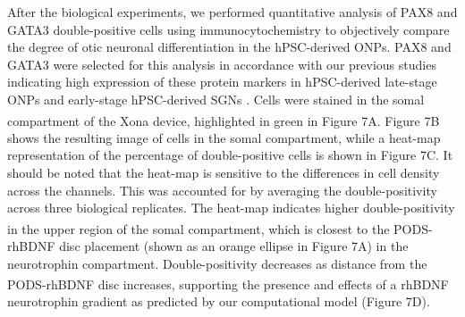 \documentclass[review]{elsarticle}
\begin{document}
 After the biological experiments, we performed quantitative analysis of PAX8 and GATA3 double-positive cells using immunocytochemistry to objectively compare the degree of otic neuronal differentiation in the hPSC-derived ONPs. PAX8 and GATA3 were selected for this analysis in accordance with our previous studies indicating high expression of these protein markers in hPSC-derived late-stage ONPs and early-stage hPSC-derived SGNs \cite{Heuer2021,Chang2020, Matsuoka2017}. Cells were stained in the somal compartment of the Xona\textsuperscript{\texttrademark} device, highlighted in green in Figure 7A. Figure 7B shows the resulting image of cells in the somal compartment, while a heat-map representation of the percentage of double-positive cells is shown in Figure 7C. It should be noted that the heat-map is sensitive to the differences in cell density across the channels. This was accounted for by averaging the double-positivity across three biological replicates. The heat-map indicates higher double-positivity in the upper region of the somal compartment, which is closest to the PODS\textsuperscript{\textregistered}-rhBDNF disc placement (shown as an orange ellipse in Figure 7A) in the neurotrophin compartment. Double-positivity decreases as distance from the PODS\textsuperscript{\textregistered}-rhBDNF disc increases, supporting the presence and effects of a rhBDNF neurotrophin gradient as predicted by our computational model (Figure 7D).
\end{document}
